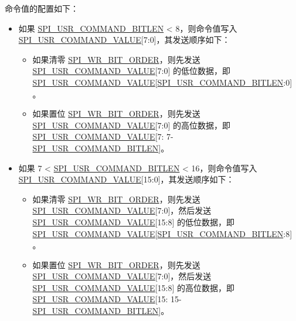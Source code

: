 \documentclass[main\_\_CN.tex]{subfiles}
\begin{document}
命令值的配置如下：
\begin{itemize}

\item 如果 \hyperref[fielddesc:SPIUSRCOMMANDBITLEN]{SPI\_USR\_COMMAND\_BITLEN} < 8，则命令值写入 \hyperref[fielddesc:SPIUSRCOMMANDVALUE]{SPI\_USR\_COMMAND\_VALUE}[7:0]，其发送顺序如下：
\begin{itemize}
    \item 如果清零 \hyperref[fielddesc:SPIWRBITORDER]{SPI\_WR\_BIT\_ORDER}，则先发送 \hyperref[fielddesc:SPIUSRCOMMANDVALUE]{SPI\_USR\_COMMAND\_VALUE}[7:0] 的低位数据，即 \hyperref[fielddesc:SPIUSRCOMMANDVALUE]{SPI\_USR\_COMMAND\_VALUE}[\hyperref[fielddesc:SPIUSRCOMMANDBITLEN]{SPI\_USR\_COMMAND\_BITLEN}:0]。
    \item 如果置位 \hyperref[fielddesc:SPIWRBITORDER]{SPI\_WR\_BIT\_ORDER}，则先发送  \hyperref[fielddesc:SPIUSRCOMMANDVALUE]{SPI\_USR\_COMMAND\_VALUE}[7:0] 的高位数据，即 \hyperref[fielddesc:SPIUSRCOMMANDVALUE]{SPI\_USR\_COMMAND\_VALUE}[7: 7-\hyperref[fielddesc:SPIUSRCOMMANDBITLEN]{SPI\_USR\_COMMAND\_BITLEN}]。
\end{itemize}

\item  如果 7 < \hyperref[fielddesc:SPIUSRCOMMANDBITLEN]{SPI\_USR\_COMMAND\_BITLEN} < 16，则命令值写入 \hyperref[fielddesc:SPIUSRCOMMANDVALUE]{SPI\_USR\_COMMAND\_VALUE}[15:0]，其发送顺序如下：
\begin{itemize}
    \item 如果清零 \hyperref[fielddesc:SPIWRBITORDER]{SPI\_WR\_BIT\_ORDER}，则先发送 \hyperref[fielddesc:SPIUSRCOMMANDVALUE]{SPI\_USR\_COMMAND\_VALUE}[7:0]，然后发送 \hyperref[fielddesc:SPIUSRCOMMANDVALUE]{SPI\_USR\_COMMAND\_VALUE}[15:8] 的低位数据，即 \hyperref[fielddesc:SPIUSRCOMMANDVALUE]{SPI\_USR\_COMMAND\_VALUE}[\hyperref[fielddesc:SPIUSRCOMMANDBITLEN]{SPI\_USR\_COMMAND\_BITLEN}:8]。
    \item 如果置位 \hyperref[fielddesc:SPIWRBITORDER]{SPI\_WR\_BIT\_ORDER}，则先发送 \hyperref[fielddesc:SPIUSRCOMMANDVALUE]{SPI\_USR\_COMMAND\_VALUE}[7:0]，然后发送 \hyperref[fielddesc:SPIUSRCOMMANDVALUE]{SPI\_USR\_COMMAND\_VALUE}[15:8] 的高位数据，即 \hyperref[fielddesc:SPIUSRCOMMANDVALUE]{SPI\_USR\_COMMAND\_VALUE}[15: 15-\hyperref[fielddesc:SPIUSRCOMMANDBITLEN]{SPI\_USR\_COMMAND\_BITLEN}]。
\end{itemize}
\end{itemize}
\end{document}
